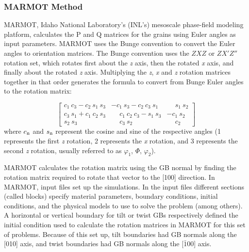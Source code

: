 \documentclass[12pt]{report}
\begin{document}
\subsubsection{MARMOT Method\label{PQ:MARMOT}}
MARMOT, Idaho National Laboratory's (INL's) mesoscale phase-field modeling platform,\cite{tonks2012} calculates the P and Q matrices for the grains using Euler angles as input parameters.  MARMOT uses the Bunge convention to convert the Euler angles to orientation matrices.  The Bunge convention uses the $ZXZ$ or $ZX'Z''$ rotation set, which rotates first about the \emph{z} axis, then the rotated \emph{x} axis, and finally about the rotated \emph{z} axis.  Multiplying the \emph{z}, \emph{x} and \emph{z} rotation matrices together in that order generates the formula to convert from Bunge Euler angles to the rotation matrix:

\begin{equation}
\label{eq:bungeMat}
\left[
\begin{array}{ccc}
c_1\ c_3 - c_2\ s_1\ s_3 & -c_1\ s_3 - c_2\ c_3\ s_1 & \phantom{-}s_1\ s_2 \\
c_3\ s_1 + c_1\ c_2\ s_3 & \phantom{-}c_1\ c_2\ c_3 - s_1\ s_3 & -c_1\ s_2 \\
s_2\ s_3 & \phantom{-}c_3\ s_2 & \phantom{-}c_2 
\end{array}
\right]
\end{equation}
where $c_\textnormal{n}$ and $s_\textnormal{n}$ represent the cosine and sine of the respective angles (1 represents the first \emph{z} rotation, 2 represents the \emph{x} rotation, and 3 represents the second \emph{z} rotation, usually referred to as\cite{randle2000} $\varphi_1$, $\Phi$, $\varphi_2$).

MARMOT calculates the rotation matrix using the GB normal by finding the rotation matrix required to rotate that vector to the [100] direction.  In MARMOT, input files set up the simulations.  In the input files different sections (called blocks) specify material parameters, boundary conditions, initial conditions, and the physical models to use to solve the problem (among others).  A horizontal or vertical boundary for tilt or twist GBs respectively defined the initial condition used to calculate the rotation matrices in MARMOT for this set of problems.  Because of this set up, tilt boundaries had GB normals along the [010] axis, and twist boundaries had GB normals along the [$\bar{1}$00] axis.
\end{document}
